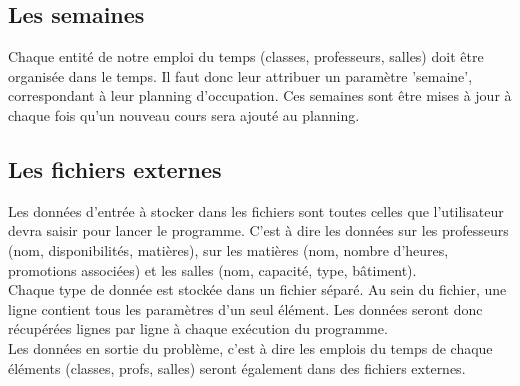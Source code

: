 \documentclass[12pt,a4paper,french]{article}
\begin{document}
\subsection{Les semaines}
Chaque entité de notre emploi du temps (classes, professeurs, salles) doit être organisée dans le temps. Il faut donc leur attribuer un paramètre 'semaine', correspondant à leur planning d'occupation.
Ces semaines sont être mises à jour à chaque fois qu'un nouveau cours sera ajouté au planning.

\subsection{Les fichiers externes}
Les données d'entrée à stocker dans les fichiers sont toutes celles que l'utilisateur devra saisir pour lancer le programme. C'est à dire les données sur les professeurs (nom, disponibilités, matières), sur les matières (nom, nombre d'heures, promotions associées) et les salles (nom, capacité, type, bâtiment).\\

Chaque type de donnée est stockée dans un fichier séparé. Au sein du fichier, une ligne contient tous les paramètres d'un seul élément. Les données seront donc récupérées lignes par ligne à chaque exécution du programme.\\

Les données en sortie du problème, c'est à dire les emplois du temps de chaque éléments (classes, profs, salles) seront également dans des fichiers externes.
\end{document}
